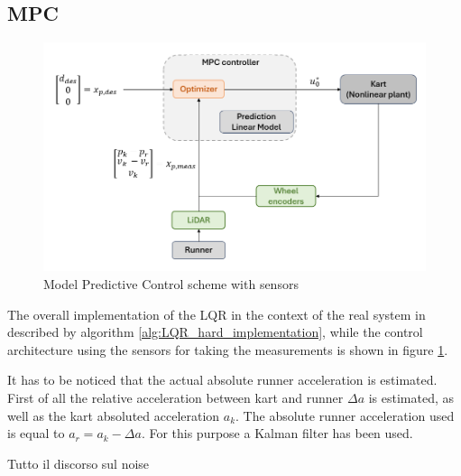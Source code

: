 \documentclass[a4paper,12pt,oneside]{book}
\begin{document}
\subsection*{MPC}
\begin{figure}
	\centering
	\includegraphics[width=1.0\textwidth]{MPC_hard_scheme.png}
	\caption{Model Predictive Control scheme with sensors}
	\label{image:MPC_hard_scheme}
\end{figure}

The overall implementation of the LQR in the context of the real system in described by algorithm \ref{alg:LQR_hard_implementation}, while the control architecture using the sensors for taking the measurements is shown in figure \ref{image:MPC_hard_scheme}.

It has to be noticed that the actual absolute runner acceleration is estimated. 
First of all the relative acceleration between kart and runner $\Delta a$ is estimated, as well as the kart absoluted acceleration $a_k$.
The absolute runner acceleration used is equal to $a_r = a_k - \Delta a$.
For this purpose a Kalman filter has been used.

Tutto il discorso sul noise



	  
	





\printbibliography


\end{document}
